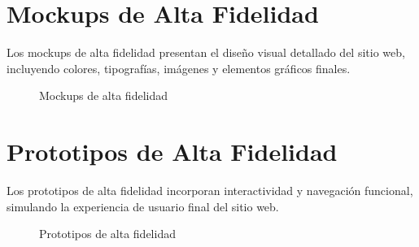 \section{Mockups de Alta Fidelidad}

Los mockups de alta fidelidad presentan el diseño visual detallado del sitio web, incluyendo colores, tipografías, imágenes y elementos gráficos finales.

\begin{figure}[htbp]
\centering
{}
\caption{Mockups de alta fidelidad}
\label{fig:mockups}
\end{figure}

\section{Prototipos de Alta Fidelidad}

Los prototipos de alta fidelidad incorporan interactividad y navegación funcional, simulando la experiencia de usuario final del sitio web.

\begin{figure}[htbp]
\centering
{}
\caption{Prototipos de alta fidelidad}
\label{fig:high-fidelity}
\end{figure}
